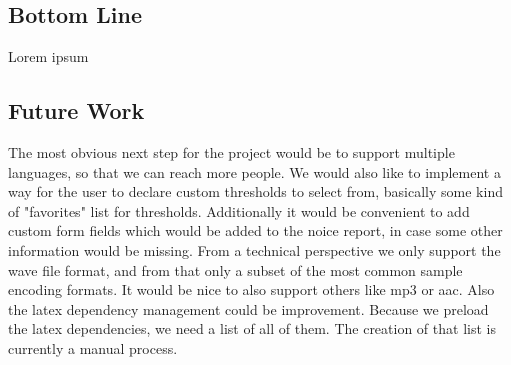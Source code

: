 \subsection{Bottom Line}
Lorem ipsum

\subsection{Future Work}
The most obvious next step for the project would be to support multiple languages, so that we can reach more people. We would also like to implement a way for the user to declare custom thresholds to select from, basically some kind of "favorites" list for thresholds. Additionally it would be convenient to add custom form fields which would be added to the noice report, in case some other information would be missing. From a technical perspective we only support the wave file format, and from that only a subset of the most common sample encoding formats. It would be nice to also support others like mp3 or aac. Also the latex dependency management could be improvement. Because we preload the latex dependencies, we need a list of all of them. The creation of that list is currently a manual process.